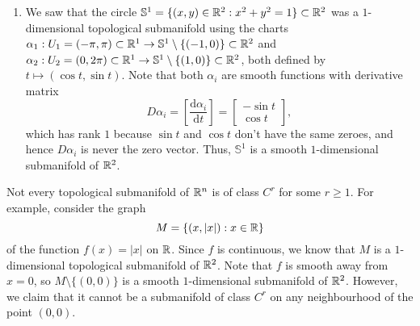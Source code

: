 \begin{enumerate}[(1)]
    \item We saw that the circle $\mathbb{S}^1 = \{(x, y) \in \mathbb{R}^2 : x^2 + y^2 = 1\} 
    \subset \mathbb{R}^2$ was a $1$-dimensional topological submanifold using
    the charts $\alpha_1 : U_1 = (-\pi, \pi) \subset \mathbb{R}^1 \to 
    \mathbb{S}^1 \setminus \{(-1, 0)\} \subset \mathbb{R}^2$ and 
    $\alpha_2 : U_2 = (0, 2\pi) \subset \mathbb{R}^1 \to \mathbb{S}^1 \setminus 
    \{(1, 0)\} \subset \mathbb{R}^2$, both defined by $t \mapsto (\cos t, \sin t)$. 
    Note that both $\alpha_i$ are smooth functions with derivative matrix 
    \[ D\alpha_i = \left[ \frac{\textrm{d}\alpha_i}{\textrm{d}t} \right] = 
    \begin{bmatrix} -\sin t \\ \cos t \end{bmatrix}, \] 
    which has rank $1$ because $\sin t$ and $\cos t$ don't have the same zeroes, 
    and hence $D\alpha_i$ is never the zero vector. Thus, $\mathbb{S}^1$ 
    is a smooth $1$-dimensional submanifold of $\mathbb{R}^2$. 
\end{enumerate}
Not every topological submanifold of $\mathbb{R}^n$ is of class $C^r$ 
for some $r \geq 1$. For example, consider the graph 
\[ M = \{(x, |x|) : x \in \mathbb{R}\} \] 
of the function $f(x) = |x|$ on $\mathbb{R}$. Since $f$ is continuous, we know that 
$M$ is a $1$-dimensional topological submanifold of $\mathbb{R}^2$. Note that $f$ is 
smooth away from $x = 0$, so $M \setminus \{(0, 0)\}$ is a smooth $1$-dimensional
submanifold of $\mathbb{R}^2$. However, we claim that it cannot be a submanifold of 
class $C^r$ on any neighbourhood of the point $(0, 0)$. 

